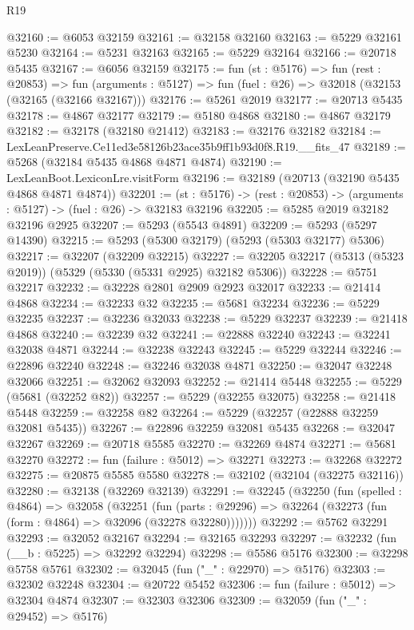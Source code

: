 \begin{lexlean}{R19}
\begin{coremodule}
@32160 := @6053 @32159
@32161 := @32158 @32160
@32163 := @5229 @32161 @5230
@32164 := @5231 @32163
@32165 := @5229 @32164
@32166 := @20718 @5435
@32167 := @6056 @32159
@32175 := fun (st : @5176) =>
  fun (rest : @20853) =>
  fun (arguments : @5127) => fun (fuel : @26) => @32018 (@32153 (@32165 (@32166 @32167)))
@32176 := @5261 @2019
@32177 := @20713 @5435
@32178 := @4867 @32177
@32179 := @5180 @4868
@32180 := @4867 @32179
@32182 := @32178 (@32180 @21412)
@32183 := @32176 @32182
@32184 := LexLeanPreserve.Ce11ed3e58126b23ace35b9ff1b93d0f8.R19.__fits_47
@32189 := @5268 (@32184 @5435 @4868 @4871 @4874)
@32190 := LexLeanBoot.LexiconLre.visitForm
@32196 := @32189 (@20713 (@32190 @5435 @4868 @4871 @4874))
@32201 := (st : @5176) -> (rest : @20853) -> (arguments : @5127) -> (fuel : @26) -> @32183 @32196
@32205 := @5285 @2019 @32182 @32196 @2925
@32207 := @5293 (@5543 @4891)
@32209 := @5293 (@5297 @14390)
@32215 := @5293 (@5300 @32179) (@5293 (@5303 @32177) @5306)
@32217 := @32207 (@32209 @32215)
@32227 := @32205 @32217 (@5313 (@5323 @2019)) (@5329 (@5330 (@5331 @2925) @32182 @5306))
@32228 := @5751 @32217
@32232 := @32228 @2801 @2909 @2923 @32017
@32233 := @21414 @4868
@32234 := @32233 @32
@32235 := @5681 @32234
@32236 := @5229 @32235
@32237 := @32236 @32033
@32238 := @5229 @32237
@32239 := @21418 @4868
@32240 := @32239 @32
@32241 := @22888 @32240
@32243 := @32241 @32038 @4871
@32244 := @32238 @32243
@32245 := @5229 @32244
@32246 := @22896 @32240
@32248 := @32246 @32038 @4871
@32250 := @32047 @32248 @32066
@32251 := @32062 @32093
@32252 := @21414 @5448
@32255 := @5229 (@5681 (@32252 @82))
@32257 := @5229 (@32255 @32075)
@32258 := @21418 @5448
@32259 := @32258 @82
@32264 := @5229 (@32257 (@22888 @32259 @32081 @5435))
@32267 := @22896 @32259 @32081 @5435
@32268 := @32047 @32267
@32269 := @20718 @5585
@32270 := @32269 @4874
@32271 := @5681 @32270
@32272 := fun (failure : @5012) => @32271
@32273 := @32268 @32272
@32275 := @20875 @5585 @5580
@32278 := @32102 (@32104 (@32275 @32116))
@32280 := @32138 (@32269 @32139)
@32291 := @32245
    (@32250
      (fun (spelled : @4864) =>
      @32058
        (@32251
          (fun (parts : @29296) =>
          @32264 (@32273 (fun (form : @4864) => @32096 (@32278 @32280)))))))
@32292 := @5762 @32291
@32293 := @32052 @32167
@32294 := @32165 @32293
@32297 := @32232 (fun (__b : @5225) => @32292 @32294)
@32298 := @5586 @5176
@32300 := @32298 @5758 @5761
@32302 := @32045 (fun ("_" : @22970) => @5176)
@32303 := @32302 @32248
@32304 := @20722 @5452
@32306 := fun (failure : @5012) => @32304 @4874
@32307 := @32303 @32306
@32309 := @32059 (fun ("_" : @29452) => @5176)

\end{coremodule}
\end{lexlean}
